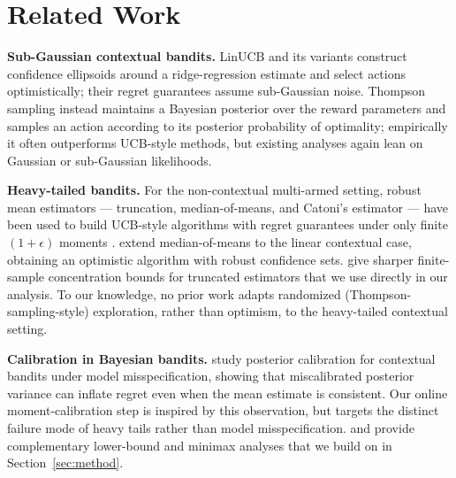 \section{Related Work}
\textbf{Sub-Gaussian contextual bandits.} LinUCB and its variants \citep{lindqvist2019linucb} construct confidence ellipsoids around a ridge-regression estimate and select actions optimistically; their regret guarantees assume sub-Gaussian noise. Thompson sampling \citep{chen2020thompson} instead maintains a Bayesian posterior over the reward parameters and samples an action according to its posterior probability of optimality; empirically it often outperforms UCB-style methods, but existing analyses again lean on Gaussian or sub-Gaussian likelihoods.

\textbf{Heavy-tailed bandits.} For the non-contextual multi-armed setting, robust mean estimators --- truncation, median-of-means, and Catoni's estimator --- have been used to build UCB-style algorithms with regret guarantees under only finite $(1+\epsilon)$ moments \citep{holt2021heavytail, rostova2021ucb, gomez2018exploration}. \citet{tanaka2023robust} extend median-of-means to the linear contextual case, obtaining an optimistic algorithm with robust confidence sets. \citet{anand2024moments} give sharper finite-sample concentration bounds for truncated estimators that we use directly in our analysis. To our knowledge, no prior work adapts randomized (Thompson-sampling-style) exploration, rather than optimism, to the heavy-tailed contextual setting.

\textbf{Calibration in Bayesian bandits.} \citet{osei2022calibration} study posterior calibration for contextual bandits under model misspecification, showing that miscalibrated posterior variance can inflate regret even when the mean estimate is consistent. Our online moment-calibration step is inspired by this observation, but targets the distinct failure mode of heavy tails rather than model misspecification. \citet{sterling2020epsilon} and \citet{davis2017regret} provide complementary lower-bound and minimax analyses that we build on in Section~\ref{sec:method}.
